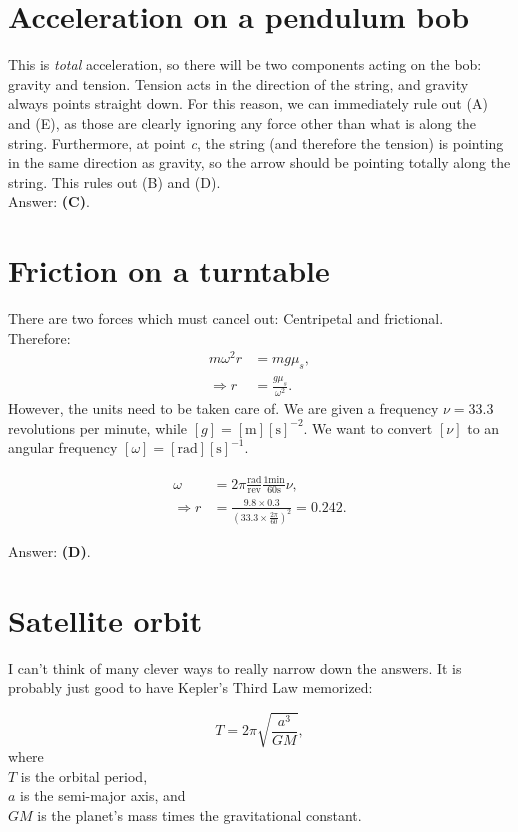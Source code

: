 \documentclass[11pt]{paper}
\newcommand{\answer}[1]{Answer: \textbf{(#1)}.}
\begin{document}
\section{Acceleration on a pendulum bob}
This is \emph{total} acceleration, so there will be two components acting on the bob: gravity and tension.  Tension acts in the direction of the string, and gravity always points straight down.  For this reason, we can immediately rule out (A) and (E), as those are clearly ignoring any force other than what is along the string.  Furthermore, at point \emph{c}, the string (and therefore the tension) is pointing in the same direction as gravity, so the arrow should be pointing totally along the string.  This rules out (B) and (D).\\

\answer{C}

\section{Friction on a turntable}
There are two forces which must cancel out:  Centripetal and frictional.\\
Therefore:
\begin{align}
m \omega^2 r &= m g \mu_s,\\
\Rightarrow r &= \frac{g \mu_s}{\omega^2}.
\end{align}
However, the units need to be taken care of.  We are given a frequency $\nu = 33.3$ revolutions per minute, while $[g] = [\text{m}][\text{s}]^{-2}$.  We want to convert $[\nu]$ to an angular frequency $[\omega] = [\text{rad}][\text{s}]^{-1}$.

\begin{align}
\omega &= 2 \pi \frac{\text{rad}}{\text{rev}} \frac{1 \text{min}}{60 \text{s}} \nu,\\
\Rightarrow r &= \frac{9.8 \times 0.3}{\left(33.3 \times \frac{2 \pi}{60} \right)^2} = 0.242.
\end{align}

\answer{D}

\section{Satellite orbit}
I can't think of many clever ways to really narrow down the answers.  It is probably just good to have Kepler's Third Law memorized:

\begin{equation}
T = 2\pi \sqrt{\frac{a^3}{GM}},
\end{equation}
where\\
$T$ is the orbital period,\\
$a$ is the semi-major axis, and\\
$GM$ is the planet's mass times the gravitational constant.\\
\end{document}

